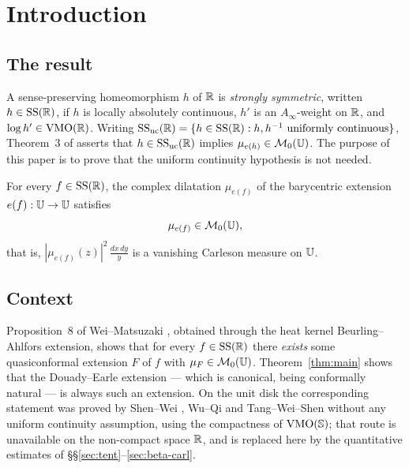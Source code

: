 %
\section{Introduction}\label{sec:intro}

\subsection{The result}

A sense-preserving homeomorphism $h$ of $\mathbb{R}$ is \emph{strongly symmetric},
written $h\in\mathrm{SS}(\mathbb{R})$, if $h$ is locally absolutely continuous, $h'$ is an
$A_\infty$-weight on $\mathbb{R}$, and $\log h'\in\mathrm{VMO}(\mathbb{R})$. Writing
$\mathrm{SS}_{\mathrm{uc}}(\mathbb{R})=\{h\in\mathrm{SS}(\mathbb{R}):h,h^{-1}\text{ uniformly continuous}\}$, Theorem~3 of
\cite{WM} asserts that $h\in\mathrm{SS}_{\mathrm{uc}}(\mathbb{R})$ implies $\mu_{e(h)}\in\mathcal{M}_0(\mathbb{U})$. The
purpose of this paper is to prove that the uniform continuity hypothesis is not
needed.

\begin{theorem}\label{thm:main}
	For every $f\in\mathrm{SS}(\mathbb{R})$, the complex dilatation $\mu_{e(f)}$ of the
	barycentric extension $e(f):\mathbb{U}\to\mathbb{U}$ satisfies
	\[
	\mu_{e(f)}\in\mathcal{M}_0(\mathbb{U}),
	\]
	that is, $|\mu_{e(f)}(z)|^2\,\frac{dx\,dy}{y}$ is a vanishing Carleson measure
	on $\mathbb{U}$.
\end{theorem}

\subsection{Context}

Proposition~8 of Wei--Matsuzaki \cite{WM}, obtained through the heat kernel
Beurling--Ahlfors extension, shows that for every $f\in\mathrm{SS}(\mathbb{R})$ there
\emph{exists} some quasiconformal extension $F$ of $f$ with
$\mu_F\in\mathcal{M}_0(\mathbb{U})$. Theorem~\ref{thm:main} shows that the Douady--Earle
extension --- which is canonical, being conformally natural --- is always such
an extension. On the unit disk the corresponding statement was proved by
Shen--Wei \cite{SW}, Wu--Qi \cite{WQ} and Tang--Wei--Shen \cite{TWS} without any
uniform continuity assumption, using the compactness of $\mathrm{VMO}(\mathbb{S})$; that route is
unavailable on the non-compact space $\mathbb{R}$, and is replaced here by the
quantitative estimates of \S\S\ref{sec:tent}--\ref{sec:beta-carl}.

